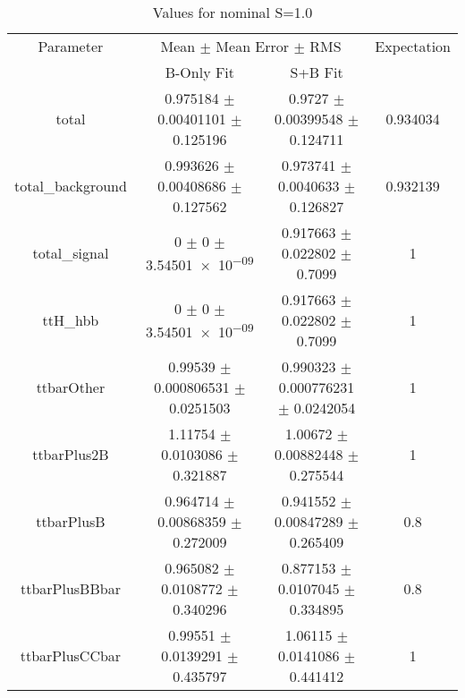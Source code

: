 \begin{table}
\centering
\caption{Values for nominal S=1.0}
\begin{tabular}{cccc}
\toprule
Parameter & \multicolumn{2}{c}{Mean $\pm$ Mean Error $\pm$ RMS} & Expectation\\
 & B-Only Fit & S+B Fit & \\
\midrule
total & \num{0.975184} $\pm$ \num{0.00401101} $\pm$ \num{0.125196} & \num{0.9727} $\pm$ \num{0.00399548} $\pm$ \num{0.124711} & \num{0.934034}\\
total\_background & \num{0.993626} $\pm$ \num{0.00408686} $\pm$ \num{0.127562} & \num{0.973741} $\pm$ \num{0.0040633} $\pm$ \num{0.126827} & \num{0.932139}\\
total\_signal & \num{0} $\pm$ \num{0} $\pm$ \num{3.54501e-09} & \num{0.917663} $\pm$ \num{0.022802} $\pm$ \num{0.7099} & \num{1}\\
ttH\_hbb & \num{0} $\pm$ \num{0} $\pm$ \num{3.54501e-09} & \num{0.917663} $\pm$ \num{0.022802} $\pm$ \num{0.7099} & \num{1}\\
ttbarOther & \num{0.99539} $\pm$ \num{0.000806531} $\pm$ \num{0.0251503} & \num{0.990323} $\pm$ \num{0.000776231} $\pm$ \num{0.0242054} & \num{1}\\
ttbarPlus2B & \num{1.11754} $\pm$ \num{0.0103086} $\pm$ \num{0.321887} & \num{1.00672} $\pm$ \num{0.00882448} $\pm$ \num{0.275544} & \num{1}\\
ttbarPlusB & \num{0.964714} $\pm$ \num{0.00868359} $\pm$ \num{0.272009} & \num{0.941552} $\pm$ \num{0.00847289} $\pm$ \num{0.265409} & \num{0.8}\\
ttbarPlusBBbar & \num{0.965082} $\pm$ \num{0.0108772} $\pm$ \num{0.340296} & \num{0.877153} $\pm$ \num{0.0107045} $\pm$ \num{0.334895} & \num{0.8}\\
ttbarPlusCCbar & \num{0.99551} $\pm$ \num{0.0139291} $\pm$ \num{0.435797} & \num{1.06115} $\pm$ \num{0.0141086} $\pm$ \num{0.441412} & \num{1}\\
\bottomrule
\end{tabular}
\end{table}